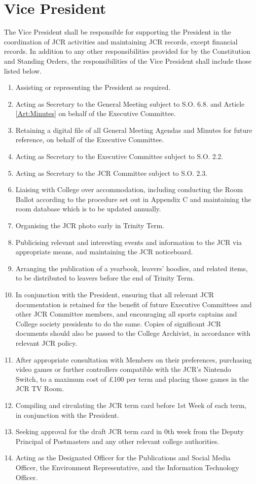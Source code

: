 \section{Vice President}
\npara The Vice President shall be responsible for supporting the President in the coordination of JCR activities and maintaining JCR records, except financial records.
\npara In addition to any other responsibilities provided for by the Constitution and Standing Orders, the responsibilities of the Vice President shall include those listed below.
\begin{enumerate}
    \item Assisting or representing the President as required.
    \item Acting as Secretary to the General Meeting subject to S.O. 6.8. and Article \ref{Art:Minutes} on behalf of the Executive Committee.
    \item Retaining a digital file of all General Meeting Agendas and Minutes for future reference, on behalf of the Executive Committee.
    \item Acting as Secretary to the Executive Committee subject to S.O. 2.2.
    \item Acting as Secretary to the JCR Committee subject to S.O. 2.3.
    \item Liaising with College over accommodation, including conducting the Room Ballot according to the procedure set out in Appendix C and maintaining the room database which is to be updated annually.
    \item Organising the JCR photo early in Trinity Term.
    \item Publicising relevant and interesting events and information to the JCR via appropriate means, and maintaining the JCR noticeboard.
    \item Arranging the publication of a yearbook, leavers' hoodies, and related items, to be distributed to leavers before the end of Trinity Term.
    \item In conjunction with the President, ensuring that all relevant JCR documentation is retained for the benefit of future Executive Committees and other JCR Committee members, and encouraging all sports captains and College society presidents to do the same. Copies of significant JCR documents should also be passed to the College Archivist, in accordance with relevant JCR policy. 
    \item After appropriate consultation with Members on their preferences, purchasing video games or further controllers compatible with the JCR’s Nintendo Switch, to a maximum cost of £100 per term and placing those games in the JCR TV Room.
    \item Compiling and circulating the JCR term card before 1st Week of each term, in conjunction with the President. 
    \item Seeking approval for the draft JCR term card in 0th week from the Deputy Principal of Postmasters and any other relevant college authorities. 
    \item Acting as the Designated Officer for the Publications and Social Media Officer, the Environment Representative, and the Information Technology Officer.
\end{enumerate}

